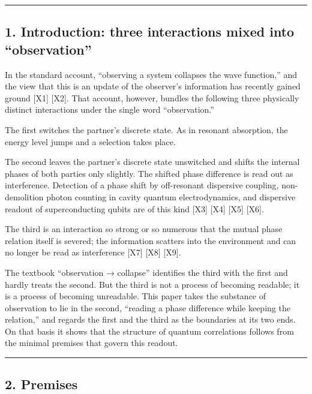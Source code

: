 \documentclass[
  a4paper,
]{article}
\begin{document}
\begin{center}\rule{0.5\linewidth}{0.5pt}\end{center}

\subsection{1. Introduction: three interactions mixed into
``observation''}\label{introduction-three-interactions-mixed-into-observation}

In the standard account, ``observing a system collapses the wave
function,'' and the view that this is an update of the observer's
information has recently gained ground {[}X1{]} {[}X2{]}. That account,
however, bundles the following three physically distinct interactions
under the single word ``observation.''

The first switches the partner's discrete state. As in resonant
absorption, the energy level jumps and a selection takes place.

The second leaves the partner's discrete state unswitched and shifts the
internal phases of both parties only slightly. The shifted phase
difference is read out as interference. Detection of a phase shift by
off-resonant dispersive coupling, non-demolition photon counting in
cavity quantum electrodynamics, and dispersive readout of
superconducting qubits are of this kind {[}X3{]} {[}X4{]} {[}X5{]}
{[}X6{]}.

The third is an interaction so strong or so numerous that the mutual
phase relation itself is severed; the information scatters into the
environment and can no longer be read as interference {[}X7{]} {[}X8{]}
{[}X9{]}.

The textbook ``observation → collapse'' identifies the third with the
first and hardly treats the second. But the third is not a process of
becoming readable; it is a process of becoming unreadable. This paper
takes the substance of observation to lie in the second, ``reading a
phase difference while keeping the relation,'' and regards the first and
the third as the boundaries at its two ends. On that basis it shows that
the structure of quantum correlations follows from the minimal premises
that govern this readout.

\begin{center}\rule{0.5\linewidth}{0.5pt}\end{center}

\subsection{2. Premises}\label{premises}
\end{document}
